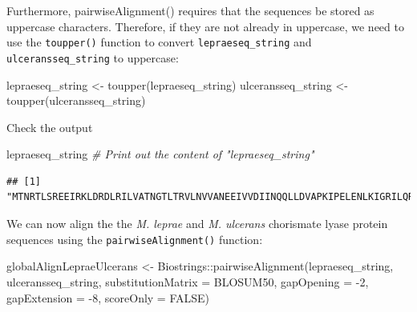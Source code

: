 \documentclass[
]{book}
\newenvironment{Shaded}{\begin{snugshade}}{\end{snugshade}}
\newcommand{\AttributeTok}[1]{\textcolor[rgb]{0.77,0.63,0.00}{#1}}
\newcommand{\CommentTok}[1]{\textcolor[rgb]{0.56,0.35,0.01}{\textit{#1}}}
\newcommand{\ConstantTok}[1]{\textcolor[rgb]{0.00,0.00,0.00}{#1}}
\newcommand{\DecValTok}[1]{\textcolor[rgb]{0.00,0.00,0.81}{#1}}
\newcommand{\FunctionTok}[1]{\textcolor[rgb]{0.00,0.00,0.00}{#1}}
\newcommand{\NormalTok}[1]{#1}
\newcommand{\OtherTok}[1]{\textcolor[rgb]{0.56,0.35,0.01}{#1}}
\newcommand{\SpecialCharTok}[1]{\textcolor[rgb]{0.00,0.00,0.00}{#1}}
\begin{document}
Furthermore, pairwiseAlignment() requires that the sequences be stored as uppercase characters. Therefore, if they are not already in uppercase, we need to use the \texttt{toupper()} function to convert \texttt{lepraeseq\_string} and \texttt{ulceransseq\_string} to uppercase:

\begin{Shaded}
\begin{Highlighting}[]
\NormalTok{lepraeseq\_string   }\OtherTok{\textless{}{-}} \FunctionTok{toupper}\NormalTok{(lepraeseq\_string)}
\NormalTok{ulceransseq\_string }\OtherTok{\textless{}{-}} \FunctionTok{toupper}\NormalTok{(ulceransseq\_string)}
\end{Highlighting}
\end{Shaded}

Check the output

\begin{Shaded}
\begin{Highlighting}[]
\NormalTok{lepraeseq\_string }\CommentTok{\# Print out the content of "lepraeseq\_string"}
\end{Highlighting}
\end{Shaded}

\begin{verbatim}
## [1] "MTNRTLSREEIRKLDRDLRILVATNGTLTRVLNVVANEEIVVDIINQQLLDVAPKIPELENLKIGRILQRDILLKGQKSGILFVAAESLIVIDLLPTAITTYLTKTHHPIGEIMAASRIETYKEDAQVWIGDLPCWLADYGYWDLPKRAVGRRYRIIAGGQPVIITTEYFLRSVFQDTPREELDRCQYSNDIDTRSGDRFVLHGRVFKNL"
\end{verbatim}

We can now align the the \emph{M. leprae} and \emph{M. ulcerans} chorismate lyase protein sequences using the \texttt{pairwiseAlignment()} function:

\begin{Shaded}
\begin{Highlighting}[]
\NormalTok{globalAlignLepraeUlcerans }\OtherTok{\textless{}{-}}\NormalTok{ Biostrings}\SpecialCharTok{::}\FunctionTok{pairwiseAlignment}\NormalTok{(lepraeseq\_string, }
\NormalTok{                                               ulceransseq\_string,}
                                               \AttributeTok{substitutionMatrix =}\NormalTok{ BLOSUM50, }
                                               \AttributeTok{gapOpening =} \SpecialCharTok{{-}}\DecValTok{2}\NormalTok{, }
                                               \AttributeTok{gapExtension =} \SpecialCharTok{{-}}\DecValTok{8}\NormalTok{, }
                                               \AttributeTok{scoreOnly =} \ConstantTok{FALSE}\NormalTok{)}
\end{Highlighting}
\end{Shaded}
\end{document}
